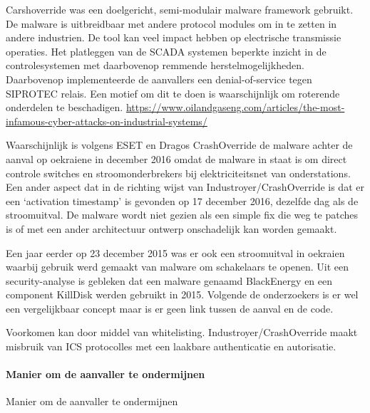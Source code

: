 		Carshoverride was een doelgericht, semi-modulair malware framework gebruikt.
		De malware is uitbreidbaar met andere protocol modules om in te zetten in andere industrien. De
		tool kan veel impact hebben op electrische transmissie operaties.
		Het platleggen van de SCADA systemen beperkte inzicht in de controlesystemen met daarbovenop
		remmende herstelmogelijkheden. Daarbovenop implementeerde de aanvallers een denial-of-service
		tegen SIPROTEC relais. Een motief om dit te doen is waarschijnlijk om roterende onderdelen te
		beschadigen.
		\url{https://www.oilandgaseng.com/articles/the-most-infamous-cyber-attacks-on-industrial-systems/}
		
		Waarschijnlijk is volgens ESET en Dragos CrashOverride de malware achter de aanval op oekraiene in
		december 2016 omdat de malware in staat is om direct controle switches en stroomonderbrekers bij
		elektriciteitsnet van onderstations. Een ander aspect dat in de richting wijst van
		Industroyer/CrashOverride is dat er een ‘activation timestamp’ is gevonden op 17 december 2016,
		dezelfde dag als de stroomuitval.
		De malware wordt niet gezien als een simple fix die weg te patches is of met een ander architectuur
		ontwerp onschadelijk kan worden gemaakt.
		
		Een jaar eerder op 23 december 2015 was er ook een stroomuitval in oekraien waarbij gebruik werd
		gemaakt van malware om schakelaars te openen. Uit een security-analyse is gebleken dat een
		malware genaamd BlackEnergy en een component KillDisk werden gebruikt in 2015. Volgende de
		onderzoekers is er wel een vergelijkbaar concept maar is er geen link tussen de aanval en de code.
		
		Voorkomen kan door middel van whitelisting.
		Industroyer/CrashOverride maakt misbruik van ICS protocolles met een laakbare authenticatie en
		autorisatie.
		
		
		\paragraph{Manier om de aanvaller te ondermijnen}
		Manier om de aanvaller te ondermijnen
		

